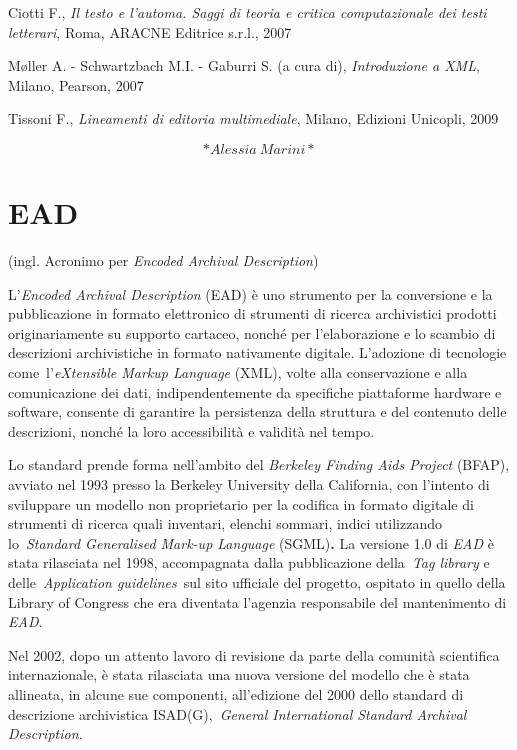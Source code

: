 \documentclass[
  b5paper,
  twoside,
  12pt,
  chapterprefix=false,
  bibliography=totocnumbered,
  parskip=false]{scrbook}
\begin{document}
Ciotti F., \emph{Il testo e l'automa. Saggi di teoria e critica
computazionale dei testi letterari}, Roma, ARACNE Editrice s.r.l., 2007

Møller A. - Schwartzbach M.I. - Gaburri S. (a cura di), \emph{Introduzione a
XML}, Milano, Pearson, 2007

Tissoni F., \emph{Lineamenti di editoria multimediale}, Milano, Edizioni
Unicopli, 2009

\[*Alessia~Marini*\]

\hypertarget{ead}{%
\chapter{EAD}\label{ead}}

(ingl. Acronimo per \emph{Encoded Archival Description})

L'\emph{Encoded Archival Description} (EAD) è uno strumento per la
conversione e la pubblicazione in formato elettronico di strumenti di
ricerca archivistici prodotti originariamente su supporto cartaceo,
nonché per l'elaborazione e lo scambio di descrizioni archivistiche in
formato nativamente digitale. L'adozione di tecnologie
come~l'\emph{eXtensible Markup Language} (XML), volte alla conservazione e
alla comunicazione dei dati, indipendentemente da specifiche piattaforme
hardware e software, consente di garantire la persistenza della
struttura e del contenuto delle descrizioni, nonché la loro
accessibilità e validità nel tempo.

Lo standard prende forma nell'ambito del \emph{Berkeley Finding Aids
Project} (BFAP), avviato nel 1993 presso la Berkeley University della
California, con l'intento di sviluppare un modello non proprietario per
la codifica in formato digitale di strumenti di ricerca quali inventari,
elenchi sommari, indici utilizzando lo~\emph{Standard Generalised Mark-up
Language} (SGML)\textbf{.} La versione 1.0 di \emph{EAD} è stata rilasciata nel
1998, accompagnata dalla pubblicazione della~\emph{Tag library} e
delle~\emph{Application guidelines}~sul sito ufficiale del progetto, ospitato
in quello della Library of Congress che era diventata l'agenzia
responsabile del mantenimento di \emph{EAD}.

Nel 2002, dopo un attento lavoro di revisione da parte della comunità
scientifica internazionale, è stata rilasciata una nuova versione del
modello che è stata allineata, in alcune sue componenti, all'edizione
del 2000 dello standard di descrizione archivistica ISAD(G),~\emph{General
International Standard Archival Description.}
\end{document}
